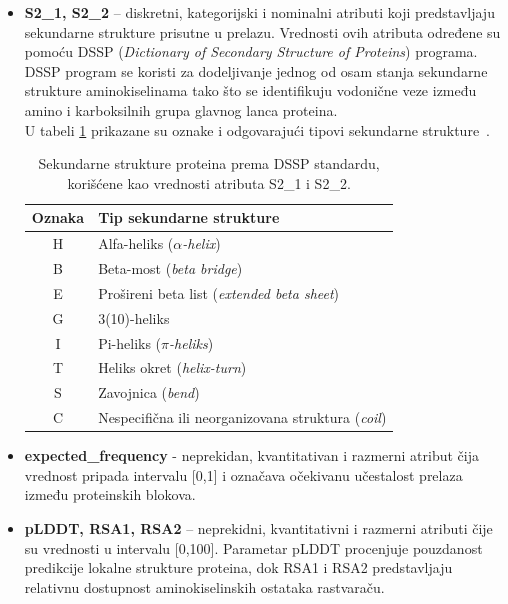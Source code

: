 \documentclass[a4paper,12pt]{article}
\begin{document}
\begin{itemize}
\begin{table}[h!]
	\caption{Aminokiseline i njihove jednoslovne oznake korišćene kao vrednosti atributa AA1 i AA2.}
	\label{Tabela:2}
\end{table}
\newpage
    \item \textbf{S2\_1, S2\_2} – diskretni, kategorijski i nominalni atributi koji predstavljaju sekundarne strukture prisutne u prelazu. Vrednosti ovih atributa određene su pomoću DSSP (\textit{Dictionary of Secondary Structure of Proteins}) programa. DSSP program se koristi za dodeljivanje jednog od osam stanja sekundarne strukture aminokiselinama tako što se identifikuju vodonične veze između amino i karboksilnih grupa glavnog lanca proteina. \\
U tabeli \ref{Tabela:3} prikazane su oznake i odgovarajući tipovi sekundarne strukture~\cite{carter2003dsspcont}.
\\
\begin{table}[h!]
    \centering
    \begin{tabular}{ |c|l| } 
    \hline
    \textbf{Oznaka} & \textbf{Tip sekundarne strukture} \\
    \hline
    H & Alfa-heliks (\textit{$\alpha$-helix}) \\
    B & Beta-most (\textit{beta bridge}) \\
    E & Prošireni beta list (\textit{extended beta sheet}) \\
    G & 3(10)-heliks \\
    I & Pi-heliks (\textit{$\pi$-heliks}) \\
    T & Heliks okret (\textit{helix-turn}) \\
    S & Zavojnica (\textit{bend}) \\
    C & Nespecifična ili neorganizovana struktura (\textit{coil}) \\
    \hline
    \end{tabular}
    \caption{Sekundarne strukture proteina prema DSSP standardu, korišćene kao vrednosti atributa S2\_1 i S2\_2.}
    \label{Tabela:3}
\end{table}
\newpage
    \item \textbf{expected\_frequency} - neprekidan, kvantitativan i razmerni atribut čija vrednost pripada intervalu [0,1] i označava očekivanu učestalost prelaza između proteinskih blokova.
    \item \textbf{pLDDT, RSA1, RSA2} – neprekidni, kvantitativni i razmerni atributi čije su vrednosti u intervalu [0,100]. Parametar pLDDT procenjuje pouzdanost predikcije lokalne strukture proteina, dok RSA1 i RSA2 predstavljaju relativnu dostupnost aminokiselinskih ostataka rastvaraču.
\end{itemize}
\end{document}
